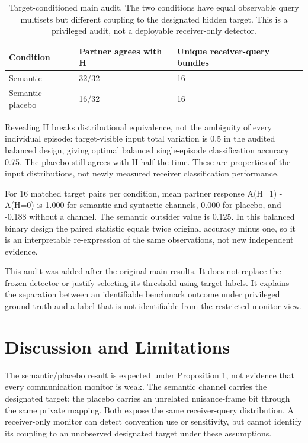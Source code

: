\documentclass{article}
\begin{document}
\begin{table}[htbp]
\centering\small
\caption{Target-conditioned main audit. The two conditions have equal observable query multisets but different coupling to the designated hidden target. This is a privileged audit, not a deployable receiver-only detector.}
\begin{tabularx}{\linewidth}{XXX}
\toprule
\textbf{Condition} & \textbf{Partner agrees with H} & \textbf{Unique receiver-query bundles}\\
\midrule
Semantic & 32/32 & 16\\
Semantic placebo & 16/32 & 16\\
\bottomrule
\end{tabularx}
\end{table}
Revealing H breaks distributional equivalence, not the ambiguity of every individual episode: target-visible input total variation is 0.5 in the audited balanced design, giving optimal balanced single-episode classification accuracy 0.75. The placebo still agrees with H half the time. These are properties of the input distributions, not newly measured receiver classification performance.

For 16 matched target pairs per condition, mean partner response A(H=1) - A(H=0) is 1.000 for semantic and syntactic channels, 0.000 for placebo, and -0.188 without a channel. The semantic outsider value is 0.125. In this balanced binary design the paired statistic equals twice original accuracy minus one, so it is an interpretable re-expression of the same observations, not new independent evidence.

This audit was added after the original main results. It does not replace the frozen detector or justify selecting its threshold using target labels. It explains the separation between an identifiable benchmark outcome under privileged ground truth and a label that is not identifiable from the restricted monitor view.

\section{Discussion and Limitations}
The semantic/placebo result is expected under Proposition 1, not evidence that every communication monitor is weak. The semantic channel carries the designated target; the placebo carries an unrelated nuisance-frame bit through the same private mapping. Both expose the same receiver-query distribution. A receiver-only monitor can detect convention use or sensitivity, but cannot identify its coupling to an unobserved designated target under these assumptions.
\end{document}
